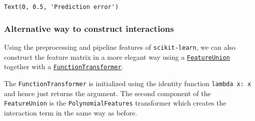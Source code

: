 \documentclass{scrartcl}
\makeatletter
\newcommand{\boxspacing}{\kern\kvtcb@left@rule\kern\kvtcb@boxsep}
\newcommand{\prompt}[4]{
        {\ttfamily\llap{{\color{#2}[#3]:\hspace{3pt}#4}}\vspace{-\baselineskip}}
    }
\makeatother
\begin{document}
            \begin{tcolorbox}[breakable, size=fbox, boxrule=.5pt, pad at break*=1mm, opacityfill=0]
\prompt{Out}{outcolor}{75}{\boxspacing}
\begin{Verbatim}[commandchars=\\\{\}]
Text(0, 0.5, 'Prediction error')
\end{Verbatim}
\end{tcolorbox}
        
    \begin{center}
    \end{center}
    
    \hypertarget{alternative-way-to-construct-interactions}{%
\subsubsection*{Alternative way to construct
interactions}\label{alternative-way-to-construct-interactions}}

Using the preprocessing and pipeline features of \texttt{scikit-learn},
we can also construct the feature matrix in a more elegant way using a
\href{https://scikit-learn.org/stable/modules/generated/sklearn.pipeline.FeatureUnion.html}{\texttt{FeatureUnion}}
together with a
\href{https://scikit-learn.org/stable/modules/generated/sklearn.preprocessing.FunctionTransformer.html}{\texttt{FunctionTransformer}}.

The \texttt{FunctionTransformer} is initialized using the identity
function \texttt{lambda\ x:\ x} and hence just returns the argument. The
second component of the \texttt{FeatureUnion} is the
\texttt{PolynomialFeatures} transformer which creates the interaction
term in the same way as before.
\end{document}
